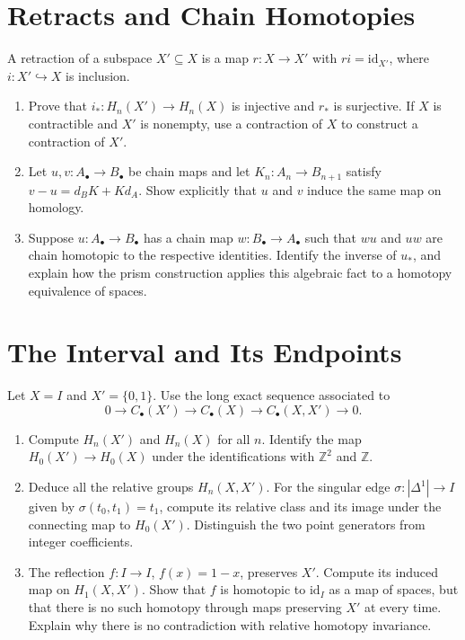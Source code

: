 \documentclass[11pt]{article}
\begin{document}
\section{Retracts and Chain Homotopies}
A retraction of a subspace $X'\subseteq X$ is a map $r:X\to X'$ with $ri=\mathrm{id}_{X'}$, where $i:X'\hookrightarrow X$ is inclusion.
\begin{enumerate}
\item Prove that $i_*:H_n(X')\to H_n(X)$ is injective and $r_*$ is surjective. If $X$ is contractible and $X'$ is nonempty, use a contraction of $X$ to construct a contraction of $X'$.
\item Let $u,v:A_\bullet\to B_\bullet$ be chain maps and let $K_n:A_n\to B_{n+1}$ satisfy $v-u=d_BK+Kd_A$. Show explicitly that $u$ and $v$ induce the same map on homology.
\item Suppose $u:A_\bullet\to B_\bullet$ has a chain map $w:B_\bullet\to A_\bullet$ such that $wu$ and $uw$ are chain homotopic to the respective identities. Identify the inverse of $u_*$, and explain how the prism construction applies this algebraic fact to a homotopy equivalence of spaces.
\end{enumerate}

\section{The Interval and Its Endpoints}
Let $X=I$ and $X'=\{0,1\}$. Use the long exact sequence associated to
\[
0\longrightarrow C_\bullet(X')\longrightarrow C_\bullet(X)
\longrightarrow C_\bullet(X,X')\longrightarrow0.
\]
\begin{enumerate}
\item Compute $H_n(X')$ and $H_n(X)$ for all $n$. Identify the map $H_0(X')\to H_0(X)$ under the identifications with $\mathbb Z^2$ and $\mathbb Z$.
\item Deduce all the relative groups $H_n(X,X')$. For the singular edge $\sigma:|\Delta^1|\to I$ given by $\sigma(t_0,t_1)=t_1$, compute its relative class and its image under the connecting map to $H_0(X')$. Distinguish the two point generators from integer coefficients.
\item The reflection $f:I\to I$, $f(x)=1-x$, preserves $X'$. Compute its induced map on $H_1(X,X')$. Show that $f$ is homotopic to $\mathrm{id}_I$ as a map of spaces, but that there is no such homotopy through maps preserving $X'$ at every time. Explain why there is no contradiction with relative homotopy invariance.
\end{enumerate}
\end{document}
